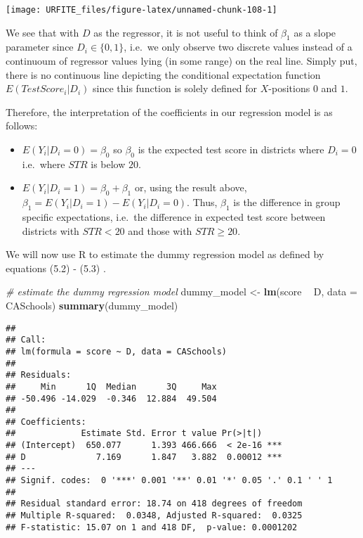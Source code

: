\documentclass[]{book}
\newenvironment{Shaded}{\begin{snugshade}}{\end{snugshade}}
\newcommand{\KeywordTok}[1]{\textcolor[rgb]{0.13,0.29,0.53}{\textbf{#1}}}
\newcommand{\DataTypeTok}[1]{\textcolor[rgb]{0.13,0.29,0.53}{#1}}
\newcommand{\StringTok}[1]{\textcolor[rgb]{0.31,0.60,0.02}{#1}}
\newcommand{\CommentTok}[1]{\textcolor[rgb]{0.56,0.35,0.01}{\textit{#1}}}
\newcommand{\OperatorTok}[1]{\textcolor[rgb]{0.81,0.36,0.00}{\textbf{#1}}}
\newcommand{\NormalTok}[1]{#1}
\theoremstyle{definition}
\theoremstyle{definition}
\theoremstyle{definition}
\theoremstyle{remark}
\begin{document}
\begin{center}\texttt{[image: URFITE\_files/figure-latex/unnamed-chunk-108-1]} \end{center}

We see that with \(D\) as the regressor, it is not useful to think of
\(\beta_1\) as a slope parameter since \(D_i \in \{0,1\}\), i.e.~we only
observe two discrete values instead of a continuoum of regressor values
lying (in some range) on the real line. Simply put, there is no
continuous line depicting the conditional expectation function
\(E(TestScore_i | D_i)\) since this function is solely defined for
\(X\)-positions \(0\) and \(1\).

Therefore, the interpretation of the coefficients in our regression
model is as follows:

\begin{itemize}
\item
  \(E(Y_i | D_i = 0) = \beta_0\) so \(\beta_0\) is the expected test
  score in districts where \(D_i=0\) i.e.~where \(STR\) is below \(20\).
\item
  \(E(Y_i | D_i = 1) = \beta_0 + \beta_1\) or, using the result above,
  \(\beta_1 = E(Y_i | D_i = 1) - E(Y_i | D_i = 0)\). Thus, \(\beta_1\)
  is the difference in group specific expectations, i.e.~the difference
  in expected test score between districts with \(STR < 20\) and those
  with \(STR \geq 20\).
\end{itemize}

We will now use R to estimate the dummy regression model as defined by
equations (5.2) - (5.3) .

\begin{Shaded}
\begin{Highlighting}[]
\CommentTok{# estimate the dummy regression model}
\NormalTok{dummy_model <-}\StringTok{ }\KeywordTok{lm}\NormalTok{(score }\OperatorTok{~}\StringTok{ }\NormalTok{D, }\DataTypeTok{data =}\NormalTok{ CASchools)}
\KeywordTok{summary}\NormalTok{(dummy_model)}
\end{Highlighting}
\end{Shaded}

\begin{verbatim}
## 
## Call:
## lm(formula = score ~ D, data = CASchools)
## 
## Residuals:
##     Min      1Q  Median      3Q     Max 
## -50.496 -14.029  -0.346  12.884  49.504 
## 
## Coefficients:
##             Estimate Std. Error t value Pr(>|t|)    
## (Intercept)  650.077      1.393 466.666  < 2e-16 ***
## D              7.169      1.847   3.882  0.00012 ***
## ---
## Signif. codes:  0 '***' 0.001 '**' 0.01 '*' 0.05 '.' 0.1 ' ' 1
## 
## Residual standard error: 18.74 on 418 degrees of freedom
## Multiple R-squared:  0.0348, Adjusted R-squared:  0.0325 
## F-statistic: 15.07 on 1 and 418 DF,  p-value: 0.0001202
\end{verbatim}
\end{document}
